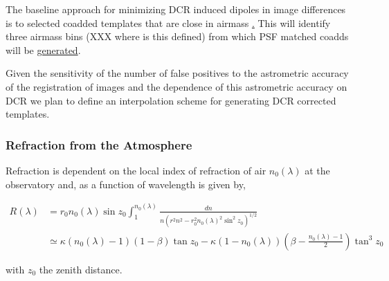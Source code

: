 The baseline approach for minimizing DCR induced dipoles in image
differences is to selected coadded templates that are close in airmass
\hyperref[sec:acRetrievTemplate]. This will identify three airmass bins (XXX
where is this defined) from which PSF matched coadds will be \hyperref[sec:acCoaddition]{generated}.

Given the sensitivity of the number of false positives to the
astrometric accuracy of the registration of images and the dependence
of this astrometric accuracy on DCR we plan to define an interpolation
scheme for generating DCR corrected templates.

\subsubsection{Refraction from the Atmosphere}

Refraction is dependent on the local index of refraction of air $n_0(\lambda)$ at the observatory and, as a function of wavelength is given by,

\begin{align}
R(\lambda) &= r_0 n_0(\lambda) \sin z_0 \int_1^{n_0(\lambda)} \frac{dn}{n \left(r^2n^2 -r_0^2n_0(\lambda)^2\sin^2z_0\right)^{1/2}} \nonumber\\
&\simeq \kappa (n_0(\lambda) - 1) (1 - \beta) \tan z_0 - \kappa (1 - n_0(\lambda)) \left(\beta - \frac{n_0(\lambda) - 1}{2}\right) \tan^3z_0
\end{align}

with $z_0$ the zenith distance.




